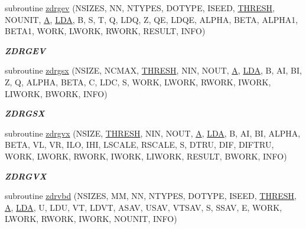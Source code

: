 \begin{DoxyCompactItemize}
subroutine \hyperlink{group__complex16__eig_gac25982b5c0c58a1f9f8025ab4ab33287}{zdrgev} (N\+S\+I\+Z\+E\+S, N\+N, N\+T\+Y\+P\+E\+S, D\+O\+T\+Y\+P\+E, I\+S\+E\+E\+D, \hyperlink{zlaqgs_8c_a0656018abfc9fa2821827415f5d5ea57}{T\+H\+R\+E\+S\+H}, N\+O\+U\+N\+I\+T, \hyperlink{classA}{A}, \hyperlink{example__user_8c_ae946da542ce0db94dced19b2ecefd1aa}{L\+D\+A}, B, S, T, Q, L\+D\+Q, Z, Q\+E, L\+D\+Q\+E, A\+L\+P\+H\+A, B\+E\+T\+A, A\+L\+P\+H\+A1, B\+E\+T\+A1, W\+O\+R\+K, L\+W\+O\+R\+K, R\+W\+O\+R\+K, R\+E\+S\+U\+L\+T, I\+N\+F\+O)
\begin{DoxyCompactList}\small\item\em {\bfseries Z\+D\+R\+G\+E\+V} \end{DoxyCompactList}\item 
subroutine \hyperlink{group__complex16__eig_gaf81dc11e477868381fba4cb8f61904ab}{zdrgsx} (N\+S\+I\+Z\+E, N\+C\+M\+A\+X, \hyperlink{zlaqgs_8c_a0656018abfc9fa2821827415f5d5ea57}{T\+H\+R\+E\+S\+H}, N\+I\+N, N\+O\+U\+T, \hyperlink{classA}{A}, \hyperlink{example__user_8c_ae946da542ce0db94dced19b2ecefd1aa}{L\+D\+A}, B, A\+I, B\+I, Z, Q, A\+L\+P\+H\+A, B\+E\+T\+A, C, L\+D\+C, S, W\+O\+R\+K, L\+W\+O\+R\+K, R\+W\+O\+R\+K, I\+W\+O\+R\+K, L\+I\+W\+O\+R\+K, B\+W\+O\+R\+K, I\+N\+F\+O)
\begin{DoxyCompactList}\small\item\em {\bfseries Z\+D\+R\+G\+S\+X} \end{DoxyCompactList}\item 
subroutine \hyperlink{group__complex16__eig_ga15555ac728d52bb12042d5b57152ecff}{zdrgvx} (N\+S\+I\+Z\+E, \hyperlink{zlaqgs_8c_a0656018abfc9fa2821827415f5d5ea57}{T\+H\+R\+E\+S\+H}, N\+I\+N, N\+O\+U\+T, \hyperlink{classA}{A}, \hyperlink{example__user_8c_ae946da542ce0db94dced19b2ecefd1aa}{L\+D\+A}, B, A\+I, B\+I, A\+L\+P\+H\+A, B\+E\+T\+A, V\+L, V\+R, I\+L\+O, I\+H\+I, L\+S\+C\+A\+L\+E, R\+S\+C\+A\+L\+E, S, D\+T\+R\+U, D\+I\+F, D\+I\+F\+T\+R\+U, W\+O\+R\+K, L\+W\+O\+R\+K, R\+W\+O\+R\+K, I\+W\+O\+R\+K, L\+I\+W\+O\+R\+K, R\+E\+S\+U\+L\+T, B\+W\+O\+R\+K, I\+N\+F\+O)
\begin{DoxyCompactList}\small\item\em {\bfseries Z\+D\+R\+G\+V\+X} \end{DoxyCompactList}\item 
subroutine \hyperlink{group__complex16__eig_ga2948dcf75ffb37ad4c8893b027ee4de1}{zdrvbd} (N\+S\+I\+Z\+E\+S, M\+M, N\+N, N\+T\+Y\+P\+E\+S, D\+O\+T\+Y\+P\+E, I\+S\+E\+E\+D, \hyperlink{zlaqgs_8c_a0656018abfc9fa2821827415f5d5ea57}{T\+H\+R\+E\+S\+H}, \hyperlink{classA}{A}, \hyperlink{example__user_8c_ae946da542ce0db94dced19b2ecefd1aa}{L\+D\+A}, U, L\+D\+U, V\+T, L\+D\+V\+T, A\+S\+A\+V, U\+S\+A\+V, V\+T\+S\+A\+V, S, S\+S\+A\+V, E, W\+O\+R\+K, L\+W\+O\+R\+K, R\+W\+O\+R\+K, I\+W\+O\+R\+K, N\+O\+U\+N\+I\+T, I\+N\+F\+O)

\end{DoxyCompactItemize}
